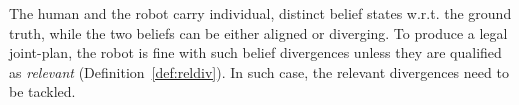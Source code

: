 \documentclass[letterpaper]{article} %
\begin{document}





The human and the robot carry individual, distinct belief states w.r.t. the ground truth,
while the two beliefs can be either aligned or diverging. 
To produce a legal joint-plan, the robot is fine with such belief divergences unless they are qualified as \textit{relevant} (Definition~\ref{def:reldiv}). 
In such case, the relevant divergences need to be tackled.
\end{document}
